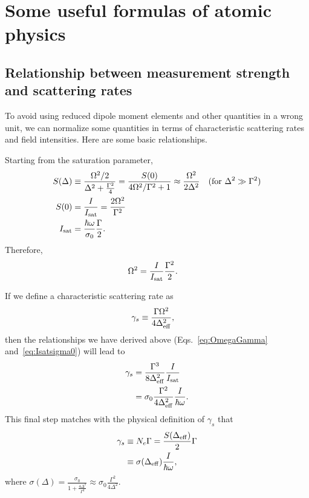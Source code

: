 \chapter{Some useful formulas of atomic physics}

\section{Relationship between measurement strength and scattering rates}
To avoid using reduced dipole moment elements and other quantities in a wrong unit, we can normalize some quantities in terms of characteristic scattering rates and field intensities.
Here are some basic relationships.

Starting from the saturation parameter,
\begin{align}
S(\Delta ) &\equiv \frac{\Omega^2/2}{\Delta^2+\frac{\Gamma^2}{4}} = \frac{S(0)}{4\Omega^2/\Gamma^2+1} \approx \frac{\Omega^2}{2\Delta^2} \quad (\text{for $\Delta^2\gg \Gamma^2$})\\
S(0) &= \frac{I}{I_{\rm sat}}= \frac{2\Omega^2}{\Gamma^2}\\
I_{\rm sat} &= \frac{\hbar \omega}{\sigma_0} \frac{\Gamma}{2}.\label{eq:Isatsigma0}
\end{align}
Therefore, 
\begin{align}\label{eq:OmegaGamma}
\Omega^2 &= \frac{I}{I_{\rm sat}}\frac{\Gamma^2}{2}.
\end{align}


If we define a characteristic scattering rate as
\begin{align}
\gamma_s &\equiv \frac{\Gamma \Omega^2}{4\Delta_{\rm eff}^2},
\end{align}
then the relationships we have derived above (Eqs.~\ref{eq:OmegaGamma} and~\ref{eq:Isatsigma0}) will lead to
\begin{align}
\gamma_s &= \frac{\Gamma^3}{8\Delta_{\rm eff}^2} \frac{I}{I_{\rm sat}}\\
&= \sigma_0 \frac{\Gamma^2}{4\Delta_{\rm eff}^2}\frac{I}{\hbar \omega}.
\end{align}
This final step matches with the physical definition of $ \gamma_s $ that 
\begin{align}
\gamma_s &\equiv N_e \Gamma =\frac{S(\Delta_{\rm eff})}{2} \Gamma\\
&\equiv \sigma(\Delta_{\rm eff}) \frac{I}{\hbar \omega},
\end{align}
where $ \sigma(\Delta)=\frac{\sigma_0}{1+\frac{4\Delta^2}{\Gamma^2}}\approx \sigma_0 \frac{\Gamma^2}{4\Delta^2} $.

